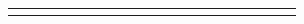 \begin{landscape}
\begin{table}[h!]
\begin{tabular}{lcllcllcllcllcllcl}
\multicolumn{1}{l|}{}     & \multicolumn{1}{c|}{}                                                                                                    &                              & \multicolumn{1}{l|}{\cellcolor[HTML]{C0C0C0}}   & \multicolumn{1}{c|}{\cellcolor[HTML]{C0C0C0}}                                                                                                       & \cellcolor[HTML]{C0C0C0}                              & \multicolumn{1}{l|}{}   & \multicolumn{1}{c|}{}                                                                                                    & {\bf }                        & \multicolumn{1}{l|}{\cellcolor[HTML]{C0C0C0}}   & \multicolumn{1}{c|}{\cellcolor[HTML]{C0C0C0}}                                                                                             & \cellcolor[HTML]{C0C0C0}{\bf C6}                      & \multicolumn{1}{l|}{}   & \multicolumn{1}{c|}{}                                                                                                               &                               & \multicolumn{1}{l|}{\cellcolor[HTML]{C0C0C0}}   & \multicolumn{1}{c|}{\cellcolor[HTML]{C0C0C0}}                                                                                                         & \cellcolor[HTML]{C0C0C0}                              \\ \cline{1-1} \cline{3-4} \cline{6-7} \cline{9-10} \cline{12-13} \cline{15-16} \cline{18-18} 

\end{tabular}
\end{table}
\end{landscape}
